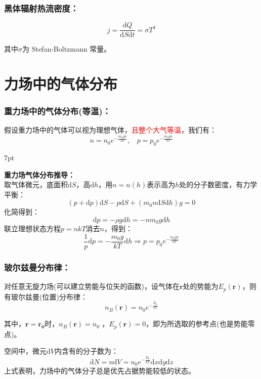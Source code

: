 \documentclass[zihao=-4,UTF8]{report}
\newenvironment{graybox}{%
\def\FrameCommand{%
\hspace{1pt}%
{\color{gray}\small \vrule width 2pt}%
{\color{graybox_color}\vrule width 4pt}%
\colorbox{graybox_color}%
}%
\MakeFramed{\advance\hsize-\width\FrameRestore}%
\noindent\hspace{-4.55pt}%
\begin{adjustwidth}{}{7pt}%
\vspace{2pt}\vspace{2pt}%
}
{%
\vspace{2pt}\end{adjustwidth}\endMakeFramed%
}
\begin{document}
\subsubsection{黑体辐射热流密度：}

\begin{equation}
    j = \frac{\mathrm{d}Q}{\mathrm{d}S\mathrm{d}t} = \sigma T^4
\end{equation}\par
{\color{gray}\small 其中$\sigma$为 Stefan-Boltzmann 常量。}
\section{力场中的气体分布}

\subsubsection{重力场中的气体分布(等温)：}
假设重力场中的气体可以视为理想气体，\textcolor{red}{且整个大气等温}，我们有：
\begin{equation}
    n = n_0e^{-\frac{m_0gh}{kT}},\ \ \ \   p = p_0e^{-\frac{m_0gh}{kT}}
\end{equation}
\begin{graybox}
    \textbf{重力场气体分布推导：}\\
    取气体微元，底面积$\mathrm{d}S$，高$\mathrm{d}h$，用$n = n(h)$表示高为$h$处的分子数密度，有力学平衡：
    \begin{equation}
        (p+\mathrm{d}p)\mathrm{d}S - p\mathrm{d}S + (m_0n\mathrm{d}S\mathrm{d}h)g = 0
    \end{equation}
    化简得到：
    \begin{equation}
        \mathrm{d}p = - \rho g\mathrm{d}h = - nm_0g\mathrm{d}h
    \end{equation}
    联立理想状态方程$p = nkT$消去$n$，得到：
    \begin{equation}
        \frac{1}{p}\mathrm{d}p = -\frac{m_0g}{kT}\mathrm{d}h \Longrightarrow p = p_0e^{-\frac{m_0gh}{kT}}
    \end{equation}
\end{graybox}
\subsubsection{玻尔兹曼分布律：}
对任意无旋力场(可以建立势能与位矢的函数)，设气体在$\boldsymbol{r}$处的势能为$E_p(\boldsymbol{r})$，则有玻尔兹曼(位置)分布律：
\begin{equation}
    n_B(\boldsymbol{r}) = n_0e^{-\frac{E_p}{kT}}
\end{equation}\par
其中，$\boldsymbol{r} = \boldsymbol{r_0}$时，$n_B(\boldsymbol{r})= n_0$ ，$E_p(\boldsymbol{r}) = 0$，即为所选取的参考点(也是势能零点)。\par
空间中，微元$\mathrm{d}V$内含有的分子数为：
\begin{equation}
    \mathrm{d}N = n\mathrm{d}V = n_0e^{-\frac{E_p}{kT}}\mathrm{d}x\mathrm{d}y\mathrm{d}z
\end{equation}
{\color{gray}\small 上式表明，力场中的气体分子总是优先占据势能较低的状态。}
\end{document}
